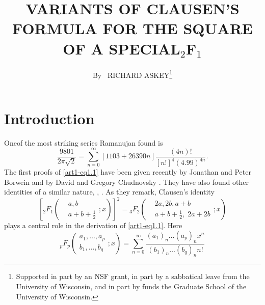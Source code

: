 
\title{VARIANTS OF CLAUSEN'S FORMULA FOR THE SQUARE OF A SPECIAL$_2$F$_1$}

\author{By~ RICHARD ASKEY\footnote{Supported in part by an NSF grant, in part by a sabbatical leave from the University of Wisconsin, and in part by funds the Graduate School of the University of Wisconsin.}}

\date{}
\maketitle

\section{Introduction}\label{art1-sec1}
One\pageoriginale of the most striking series Ramanujan \cite{art1-key10} found is 
\begin{equation}
\frac{9801}{2\pi\sqrt{2}} = \sum\limits^\infty_{n=0} [1103+26390n] \frac{(4n)!}{[n!]^4 (4.99)^{4n}}.\label{art1-eq1.1}
\end{equation}
The first proofs of \ref{art1-eq1.1} have been given recently by Jonathan and Peter Borwein \cite{art1-key3} and by David and Gregory Chudnovsky \cite{art1-key5}. They have also found other identities of a similar nature, \cite{art1-key4}, \cite{art1-key5}. As they remark, Clausen's identity \cite{art1-key6}
\begin{equation}
\left[{}_2 F_1 \left(
\begin{aligned}
& a, b\\
& a + b + \frac{1}{2}\end{aligned};x
\right) \right]^2 = {}_3 F_2 \left(
\begin{aligned}
& 2a, 2b, a + b \\
&  a+ b+ \frac{1}{2}, \; 2a+ 2 b 
\end{aligned} ;x
 \right)
\label{art1-eq1.2}
\end{equation}
plays a central role in the derivation of \eqref{art1-eq1.1}. Here 
\begin{equation}
{}_p F_p \left(
\begin{aligned}
a_1, \ldots, a_p\\
b_1, \ldots, b_q
\end{aligned}; x
\right) = \sum\limits^\infty_{n=0} \frac{(a_1)_n \ldots (a_p)_n x^n}{(b_1)_n \ldots (b_q)_n n!}
\label{art1-eq1.3}
\end{equation}
